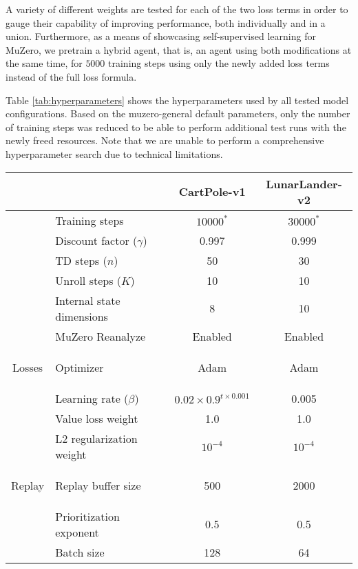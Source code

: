 A variety of different weights are tested for each of the two loss terms in order to gauge their capability of improving performance, both individually and in a union. Furthermore, as a means of showcasing self-supervised learning for MuZero, we pretrain a hybrid agent, that is, an agent using both modifications at the same time, for $5000$ training steps using only the newly added loss terms instead of the full loss formula.

Table \ref{tab:hyperparameters} shows the hyperparameters used by all tested model configurations. Based on the muzero-general default parameters, only the number of training steps was reduced to be able to perform additional test runs with the newly freed resources. Note that we are unable to perform a comprehensive hyperparameter search due to technical limitations.
\begin{table}[ht]
    \centering
    \begin{tabular}{|c|l||c|c|}
        \hline
        & & CartPole-v1 & LunarLander-v2 \\
        \hline\hline

        & Training steps & $10000^*$ & $30000^*$ \\
        \cline{2-4}
        & Discount factor ($\gamma$) & 0.997 & 0.999 \\
        \cline{2-4}
        & TD steps ($n$) & 50 & 30 \\
        \cline{2-4}
        & Unroll steps ($K$) & 10 & 10 \\
        \cline{2-4}
        & Internal state dimensions & 8 & 10 \\
        \cline{2-4}
        & MuZero Reanalyze & Enabled & Enabled \\

        \hline

        \multirow{4.1}{*}{\begin{sideways}Losses\end{sideways}} & Optimizer & Adam & Adam \\
        \cline{2-4}
        & Learning rate ($\beta$) & $0.02 \times 0.9^{t \times 0.001}$ & 0.005 \\
        \cline{2-4}
        & Value loss weight & 1.0 & 1.0 \\
        \cline{2-4}
        & L2 regularization weight & $10^{-4}$ & $10^{-4}$ \\

        \hline

        \multirow{3.2}{*}{\begin{sideways}Replay\end{sideways}} & Replay buffer size & 500 & 2000 \\
        \cline{2-4}
        & Prioritization exponent & 0.5 & 0.5 \\
        \cline{2-4}
        & Batch size & 128 & 64 \\


\end{tabular}
\end{table}
